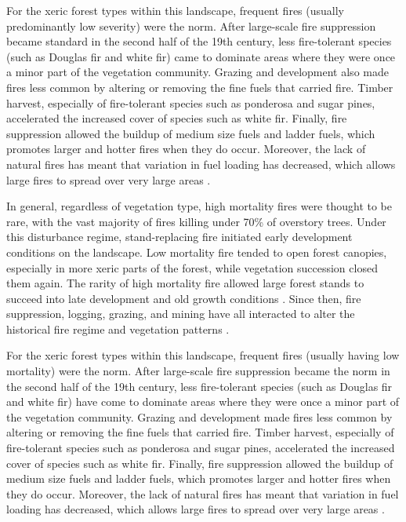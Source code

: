 For the xeric forest types within this landscape, frequent fires (usually predominantly low severity) were the norm. After large-scale fire suppression became standard in the second half of the 19th century, less fire-tolerant species (such as Douglas fir and white fir) came to dominate areas where they were once a minor part of the vegetation community. Grazing and development also made fires less common by altering or removing the fine fuels that carried fire. Timber harvest, especially of fire-tolerant species such as ponderosa and sugar pines, accelerated the increased cover of species such as white fir. Finally, fire suppression allowed the buildup of medium size fuels and ladder fuels, which promotes larger and hotter fires when they do occur. Moreover, the lack of natural fires has meant that variation in fuel loading has decreased, which allows large fires to spread over very large areas \citep{Hessburg2005,Stephens2015,Knapp2013}.


In general, regardless of vegetation type, high mortality fires were thought to be rare, with the vast majority of fires killing under 70\% of overstory trees. Under this disturbance regime, stand-replacing fire initiated early development conditions on the landscape. Low mortality fire tended to open forest canopies, especially in more xeric parts of the forest, while vegetation succession closed them again. The rarity of high mortality fire allowed large forest stands to succeed into late development and old growth conditions \citep{SNEP1996,Mallek2013,Safford2014,SNEP1996a}. Since then, fire suppression, logging, grazing, and mining have all interacted to alter the historical fire regime and vegetation patterns \citep{Stephens2015,Knapp2013}. 

For the xeric forest types within this landscape, frequent fires (usually having low mortality) were the norm. After large-scale fire suppression became the norm in the second half of the 19th century, less fire-tolerant species (such as Douglas fir and white fir) have come to dominate areas where they were once a minor part of the vegetation community. Grazing and development made fires less common by altering or removing the fine fuels that carried fire. Timber harvest, especially of fire-tolerant species such as ponderosa and sugar pines, accelerated the increased cover of species such as white fir. Finally, fire suppression allowed the buildup of medium size fuels and ladder fuels, which promotes larger and hotter fires when they do occur. Moreover, the lack of natural fires has meant that variation in fuel loading has decreased, which allows large fires to spread over very large areas \citep{Hessburg2005}.

